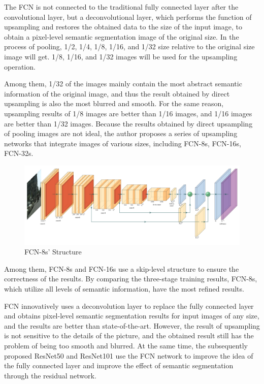 The FCN is not connected to the traditional fully connected layer after the convolutional layer, but a deconvolutional layer, which performs the function of upsampling and restores the obtained data to the size of the input image, to obtain a pixel-level semantic segmentation image of the original size. In the process of pooling, 1/2, 1/4, 1/8, 1/16, and 1/32 size relative to the original size image will get. 1/8, 1/16, and 1/32 images will be used for the upsampling operation. 

Among them, 1/32 of the images mainly contain the most abstract semantic information of the original image, and thus the result obtained by direct upsampling is also the most blurred and smooth. For the same reason, upsampling results of 1/8 images are better than 1/16 images, and 1/16 images are better than 1/32 images. Because the results obtained by direct upsampling of pooling images are not ideal, the author proposes a series of upsampling networks that integrate images of various sizes, including FCN-8s, FCN-16s, FCN-32s.

\begin{figure}[htb]
    \centering
    \includegraphics[width=1\textwidth]{figures/FCN8.jpg}
    \caption{FCN-8s' Structure \cite{plotNeuralNet}}\label{FCN8}
\end{figure}

Among them, FCN-8s and FCN-16s use a skip-level structure to ensure the correctness of the results. By comparing the three-stage training results, FCN-8s, which utilize all levels of semantic information, have the most refined results.

FCN innovatively uses a deconvolution layer to replace the fully connected layer and obtains pixel-level semantic segmentation results for input images of any size, and the results are better than state-of-the-art. However, the result of upsampling is not sensitive to the details of the picture, and the obtained result still has the problem of being too smooth and blurred. At the same time, the subsequently proposed ResNet50 and ResNet101 use the FCN network to improve the idea of ​​the fully connected layer and improve the effect of semantic segmentation through the residual network.

